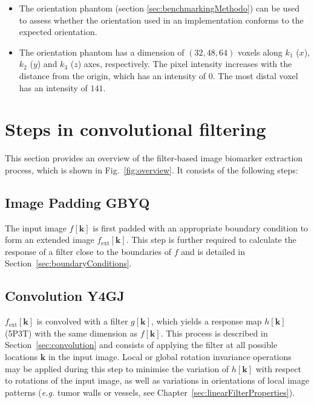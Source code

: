 \documentclass[fleqn,a4paper,oneside,openany]{book}
\newcommand\id[1]{{\hfill\normalsize{\idfont #1}}}
\newcommand\textid[1]{{\normalsize{\idfont #1}}}
\begin{document}
\vspace{2mm}
\begin{tcolorbox}[width=150mm, halign=left, colframe=black, colback=white, boxsep=0mm, arc=3mm, colframe=black!50!white,
title=Implementation Troubleshooting, title filled=true, fonttitle=\bfseries]
\begin{itemize}
\item The orientation phantom (section \ref{sec:benchmarkingMethodo}) can be used to assess whether the orientation used in an implementation conforms to the expected orientation.
\item The orientation phantom has a dimension of $(32, 48, 64)$ voxels along $k_1$ ($x$), $k_2$ ($y$) and $k_3$ ($z$) axes, respectively. The pixel intensity increases with the distance from the origin, which has an intensity of $0$. The most distal voxel has an intensity of $141$.
\end{itemize}
\end{tcolorbox}

%
\section{Steps in convolutional filtering}\label{sec:overview}
%
This section provides an overview of the filter-based image biomarker extraction process, which is shown in Fig.~\ref{fig:overview}.
It consists of the following steps:
%
\subsection[Image Padding]{Image Padding \id{GBYQ}}
%
The input image $f[\boldsymbol{k}]$ is first padded with an appropriate boundary condition to form an extended image $f_{\text{ext}}[\boldsymbol{k}]$. This step is further required to calculate the response of a filter close to the boundaries of $f$ and is detailed in Section~\ref{sec:boundaryConditions}.
%
\subsection[Convolution]{Convolution \id{Y4GJ}}
%
$f_{\text{ext}}[\boldsymbol{k}]$ is convolved with a filter $g[\boldsymbol{k}]$, which yields a response map $h[\boldsymbol{k}]$ (\textid{5P3T}) with the same dimension as $f[\boldsymbol{k}]$.
This process is described in Section~\ref{sec:convolution} and consists of applying the filter at all possible locations $\boldsymbol{k}$ in the input image.
Local or global rotation invariance operations may be applied during this step to minimise the variation of  $h[\boldsymbol{k}]$ with respect to rotations of the input image, as well as variations in orientations of local image patterns (\textit{e.g.} tumor walls or vessels, see Chapter~\ref{sec:linearFilterProperties}).
%
\end{document}
